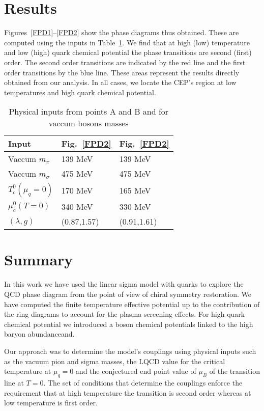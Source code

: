 \documentclass[%
 reprint,
showpacs,preprintnumbers,
 amsmath,amssymb,
onecolumn]{revtex4}
\begin{document}
\section{\label{sec:level8}Results}

Figures~\ref{FPD1}--\ref{FPD2} show the phase diagrams thus obtained. These are computed using the inputs in Table~\ref{tab-1}.  We find that at high (low) temperature and low (high) quark chemical potential the phase transitions are second (first) order. The second order transitions are indicated by the red line and the first order transitions by the blue line. These areas represent the results directly obtained from our analysis.  In all cases, we locate the CEP’s region at low temperatures and high quark chemical potential.
\begin{table}
\centering
\caption{Physical inputs from points A and B and for vaccum bosons masses}
\label{tab-1}       %
\begin{tabular}{lll}
\hline
Input & Fig.~\ref{FPD2} & Fig.~\ref{FPD2}  \\\hline
Vaccum $m_\pi$ & 139 MeV & 139 MeV \\
Vaccum $m_\sigma$ & 475 MeV & 475 MeV \\
$T^0_c(\mu_q=0)$ & 170 MeV & 165 MeV \\
$\mu^0_c(T = 0)$ & 340 MeV & 330 MeV \\
$(\lambda,g)$ & (0.87,1.57) & (0.91,1.61) \\\hline
\end{tabular}
\end{table}

\section{\label{sec:level9}Summary}

In this work we have used the linear sigma model with quarks to explore the QCD phase diagram from the point of view of chiral symmetry restoration. We have computed the finite temperature effective potential up to the contribution of the ring diagrams to account for the plasma screening effects. For high quark chemical potential we introduced a boson chemical potentials linked to the high baryon abundanceand.

Our approach was to determine the model's couplings using physical inputs such as the vacuum pion and sigma masses, the LQCD value for the critical temperature at $\mu_q=0$ and the conjectured end point value of $\mu_B$ of the transition line at $T=0$. The set of conditions that determine the couplings enforce the requirement that at high temperature the transition is second order whereas at low temperature is first order.
\end{document}
